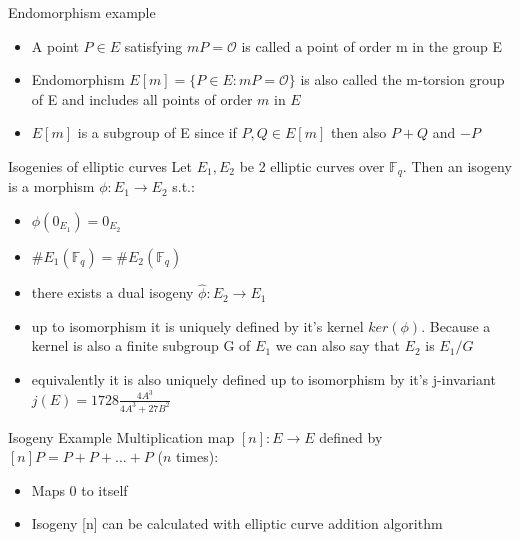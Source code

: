 \documentclass[handout]{beamer}
\begin{document}
\begin{frame}{Endomorphism example}
\begin{itemize}[\textbullet]
	\item A point $P\in E$ satisfying $mP=\mathcal{O}$ is called a point of order m in the group E\pause
	\item Endomorphism $E[m] = \{P\in E: mP = \mathcal{O}\}$ is also called the m-torsion group of E and includes all points of order $m$ in $E$\pause
	\item $E[m] $ is a subgroup of E since if $P,Q\in E[m]$ then also $P+Q$ and $-P$
\end{itemize}	

\end{frame}


\begin{frame}{Isogenies of elliptic curves}  %
Let $E_1,E_2$ be 2 elliptic curves over $\mathbb{F}_q$. Then an isogeny is a morphism $\phi: E_1 \to E_2$ s.t.:
\begin{itemize}[\textbullet]
	\item $\phi(0_{E_1})= 0_{E_2}$\pause
	\item $\#E_1(\mathbb{F}_q) = \#E_2(\mathbb{F}_q)$\pause
	\item there exists a dual isogeny $\hat{\phi}: E_2 \to E_1$\pause
	\item up to isomorphism it is uniquely defined by it's kernel $ker(\phi)$. Because a kernel is also a finite subgroup G of $E_1$ we can also say that $E_2$ is $E_1/G$\pause
	\item equivalently it is also uniquely defined up to isomorphism by it's j-invariant $j(E)=1728\frac{4A^3}{4A^3+27B^2}$
\end{itemize}
\end{frame}

\begin{frame}{Isogeny Example}
	Multiplication map $[n]: E \to E$ defined by $[n]P = P + P + ...+ P$ ($n$ times):
	\begin{itemize}[\textbullet]
		\item Maps 0 to itself

		\item Isogeny [n] can be calculated with elliptic curve addition algorithm %
		
	\end{itemize}

\end{frame}
\end{document}
